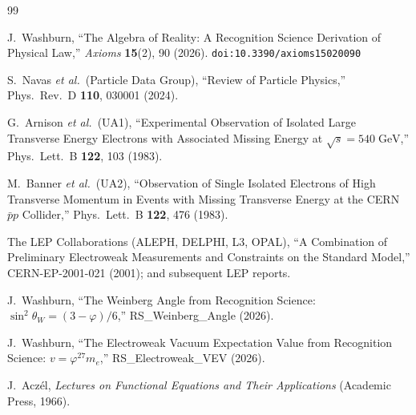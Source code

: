 \documentclass[12pt,a4paper]{article}
\theoremstyle{definition}
\theoremstyle{remark}
\begin{document}
\begin{thebibliography}{99}

J.~Washburn, ``The Algebra of Reality: A Recognition Science Derivation
of Physical Law,'' \emph{Axioms} \textbf{15}(2), 90 (2026).
\texttt{doi:10.3390/axioms15020090}

S.~Navas \textit{et al.}\ (Particle Data Group),
``Review of Particle Physics,'' Phys.\ Rev.\ D \textbf{110}, 030001
(2024).

G.~Arnison \textit{et al.}\ (UA1), ``Experimental Observation of
Isolated Large Transverse Energy Electrons with Associated Missing
Energy at $\sqrt{s} = 540\;\mathrm{GeV}$,'' Phys.\ Lett.\ B
\textbf{122}, 103 (1983).

M.~Banner \textit{et al.}\ (UA2), ``Observation of Single Isolated
Electrons of High Transverse Momentum in Events with Missing
Transverse Energy at the CERN $\bar{p}p$ Collider,'' Phys.\ Lett.\ B
\textbf{122}, 476 (1983).

The LEP Collaborations (ALEPH, DELPHI, L3, OPAL), ``A Combination of
Preliminary Electroweak Measurements and Constraints on the Standard
Model,'' CERN-EP-2001-021 (2001); and subsequent LEP reports.

J.~Washburn, ``The Weinberg Angle from Recognition Science:
$\sin^2\theta_W = (3 - \varphi)/6$,'' RS\_Weinberg\_Angle (2026).

J.~Washburn, ``The Electroweak Vacuum Expectation Value from
Recognition Science: $v = \varphi^{27} m_e$,'' RS\_Electroweak\_VEV
(2026).

J.~Acz\'el, \emph{Lectures on Functional Equations and Their
Applications} (Academic Press, 1966).

\end{thebibliography}
\end{document}
